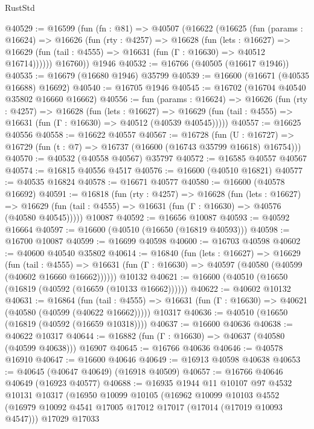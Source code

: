\begin{lexlean}{RustStd}
\begin{coremodule}
@40529 := @16599
    (fun (fn : @81) =>
    @40507
      (@16622
        (@16625
          (fun (params : @16624) =>
          @16626
            (fun (rty : @4257) =>
            @16628
              (fun (lets : @16627) =>
              @16629 (fun (tail : @4555) => @16631 (fun (Γ : @16630) => @40512 @16714))))))
        @16760))
    @1946
@40532 := @16766 (@40505 (@16617 @1946))
@40535 := @16679 (@16680 @1946) @35799
@40539 := @16600 (@16671 (@40535 @16688) @16692)
@40540 := @16705 @1946
@40545 := @16702 (@16704 @40540 @35802 @16660 @16662)
@40556 := fun (params : @16624) =>
  @16626
    (fun (rty : @4257) =>
    @16628
      (fun (lets : @16627) =>
      @16629 (fun (tail : @4555) => @16631 (fun (Γ : @16630) => @40512 (@40539 @40545)))))
@40557 := @16625 @40556
@40558 := @16622 @40557
@40567 := @16728
    (fun (U : @16727) => @16729 (fun (t : @7) => @16737 (@16600 (@16743 @35799 @16618) @16754)))
@40570 := @40532 (@40558 @40567) @35797
@40572 := @16585 @40557 @40567
@40574 := @16815 @40556 @4517
@40576 := @16600 (@40510 @16821)
@40577 := @40535 @16824
@40578 := @16671 @40577
@40580 := @16600 (@40578 @16692)
@40591 := @16818
    (fun (rty : @4257) =>
    @16628
      (fun (lets : @16627) =>
      @16629 (fun (tail : @4555) => @16631 (fun (Γ : @16630) => @40576 (@40580 @40545)))))
    @10087
@40592 := @16656 @10087
@40593 := @40592 @16664
@40597 := @16600 (@40510 (@16650 (@16819 @40593)))
@40598 := @16700 @10087
@40599 := @16699 @40598
@40600 := @16703 @40598
@40602 := @40600 @40540 @35802
@40614 := @16840
    (fun (lets : @16627) =>
    @16629
      (fun (tail : @4555) =>
      @16631 (fun (Γ : @16630) => @40597 (@40580 (@40599 (@40602 @16660 @16662))))))
    @10132
@40621 := @16600 (@40510 (@16650 (@16819 (@40592 (@16659 (@10133 @16662))))))
@40622 := @40602 @10132
@40631 := @16864
    (fun (tail : @4555) => @16631 (fun (Γ : @16630) => @40621 (@40580 (@40599 (@40622 @16662)))))
    @10317
@40636 := @40510 (@16650 (@16819 (@40592 (@16659 @10318))))
@40637 := @16600 @40636
@40638 := @40622 @10317
@40644 := @16882 (fun (Γ : @16630) => @40637 (@40580 (@40599 @40638))) @16907
@40645 := @16766 @40636
@40646 := @40578 @16910
@40647 := @16600 @40646
@40649 := @16913 @40598 @40638
@40653 := @40645 (@40647 @40649) (@16918 @40509)
@40657 := @16766 @40646 @40649 (@16923 @40577)
@40688 := @16935
    @1944
    @11
    @10107
    @97
    @4532
    @10131
    @10317
    (@16950
      @10099
      @10105
      (@16962
        @10099
        @10103
        @4552
        (@16979 @10092 @4541 @17005 @17012 @17017 (@17014 (@17019 @10093 @4547)))
        @17029
        @17033

\end{coremodule}
\end{lexlean}
